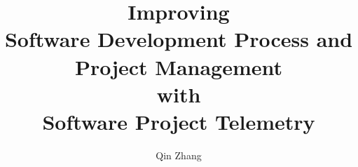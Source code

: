 \documentclass[11pt,oneside,final,times,dissertation,actual]{uhthesis2e}
\begin{document}
 
  \title{Improving\\Software Development Process and Project Management\\with\\Software Project Telemetry}
  \author{Qin Zhang}
  \maketitle

 
  \begin{frontmatter}
    \signaturepage
    \copyrightpage
    
    \setlength{\parindent}{6mm} %
    \setlength{\parskip}{3mm}   %
    
    
             

    \tableofcontents
    
    \setlength{\parindent}{15mm} %
    \listoftables
    \listoffigures
  \end{frontmatter}
  
  
  \setlength{\parindent}{6mm} %
  \setlength{\parskip}{3mm}   %
  
  
  
  
  
  
  
  
  
  
    
  \appendix
  
  
  

  
  
\end{document}
